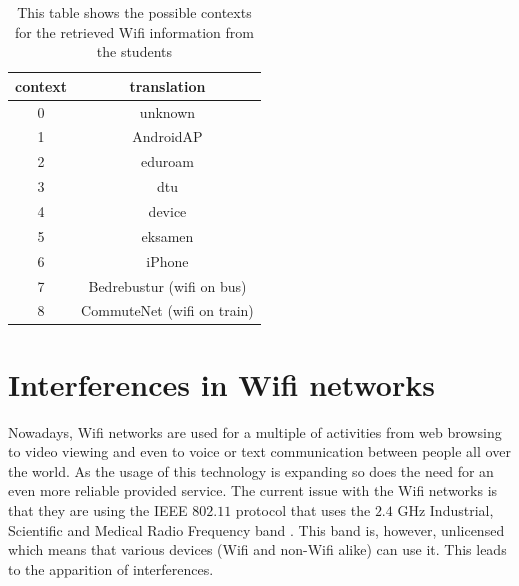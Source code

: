 \begin{table}[h]
\centering
\begin{tabular}{cc}
\hline
\textbf{context} & \textbf{translation}       \\ \hline
0                & unknown                    \\
1                & AndroidAP                  \\
2                & eduroam                    \\
3                & dtu                        \\
4                & device                     \\
5                & eksamen                    \\
6                & iPhone                     \\
7                & Bedrebustur (wifi on bus)  \\
8                & CommuteNet (wifi on train) \\ \hline
\end{tabular}
\caption{This table shows the possible contexts for the retrieved Wifi
information from the students}
\label{tab:context_translation}
\end{table}


\section{Interferences in Wifi networks}

Nowadays, Wifi networks are used for a multiple of activities from web browsing
to video viewing and even to voice or text communication between people all over
the world. As the usage of this technology is expanding so does the need for an
even more reliable provided service. The current issue with the Wifi networks is
that they are using the IEEE $802.11$ protocol \cite{WLP} that uses the $2.4$
GHz Industrial, Scientific and Medical Radio Frequency band
\cite{Flickenger:2003:BWC:940809}. This band is, however, unlicensed which means
that various devices (Wifi and non-Wifi alike) can use it. This leads to the
apparition of interferences. 

